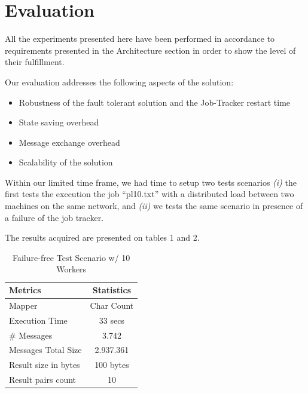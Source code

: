 \documentclass[times, 10pt,twocolumn]{article}
\begin{document}
	\section{Evaluation}

    All the experiments presented here have been performed in accordance to requirements presented in the Architecture section in order to show the level of their fulfillment.
    
    Our evaluation addresses the following aspects of the solution:
    
    \begin{itemize}
        \item Robustness of the fault tolerant solution and the Job-Tracker restart time
        \vspace{-5pt}
        \item State saving overhead
        \vspace{-5pt}
        \item Message exchange overhead
        \vspace{-5pt}
        \item Scalability of the solution
    \end{itemize}

    Within our limited time frame, we had time to setup two tests scenarios \textit{(i)} the first tests the execution the job ``pl10.txt'' with a distributed load between two machines on the same network, and \textit{(ii)} we tests the same scenario in presence of a failure of the job tracker.
    
    The results acquired are presented on tables 1 and 2.

    \begin{table}
        \centering
        \label{eval1}
        \caption{Failure-free Test Scenario w/ 10 Workers}
    \begin{tabular}{l | c}
        \toprule
        Metrics & Statistics\\
        \midrule
        Mapper & Char Count \\ 
        Execution Time & 33 secs \\ 
        \# Messages & 3.742 \\ 
        Messages Total Size & 2.937.361 \\ 
        Result size in bytes & 100 bytes \\
        Result pairs count & 10 \\
        \bottomrule
    \end{tabular} 
    \end{table}
\end{document}
